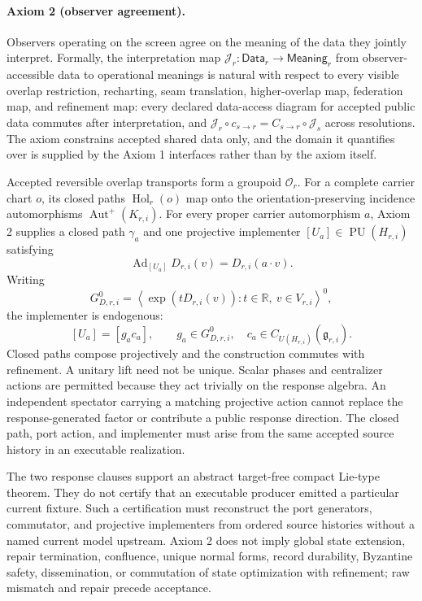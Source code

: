 \paragraph{Axiom 2 (observer agreement).}
Observers operating on the screen agree on the meaning of the data they
jointly interpret. Formally, the interpretation map
\(\mathcal J_r:\mathsf{Data}_r\to\mathsf{Meaning}_r\) from
observer-accessible data to operational meanings is natural with respect to
every visible overlap restriction, recharting, seam translation,
higher-overlap map, federation map, and refinement map: every declared
data-access diagram for accepted public data commutes after interpretation,
and \(\mathcal J_r\circ c_{s\to r}=C_{s\to r}\circ\mathcal J_s\) across
resolutions. The axiom constrains accepted shared data only, and the domain
it quantifies over is supplied by the Axiom 1 interfaces rather than by the
axiom itself.

Accepted reversible overlap transports form a groupoid \(\mathcal O_r\).
For a complete carrier chart \(o\), its closed paths
\(\operatorname{Hol}_r(o)\) map onto the orientation-preserving incidence
automorphisms \(\operatorname{Aut}^{+}(K_{r,i})\). For every proper carrier
automorphism \(a\), Axiom 2 supplies a closed path \(\gamma_a\) and one
projective implementer
\([U_a]\in\operatorname{PU}(H_{r,i})\) satisfying
\[
\operatorname{Ad}_{[U_a]}D_{r,i}(v)=D_{r,i}(a\cdot v).
\]
Writing
\[
G_{D,r,i}^{0}
=
\left\langle
\exp(tD_{r,i}(v)):t\in\mathbb R,\ v\in V_{r,i}
\right\rangle^{0},
\]
the implementer is endogenous:
\[
[U_a]=[g_a c_a],
\qquad
g_a\in G_{D,r,i}^{0},
\quad
c_a\in C_{U(H_{r,i})}(\mathfrak g_{r,i}).
\]
Closed paths compose projectively and the construction commutes with
refinement. A unitary lift need not be unique. Scalar phases and centralizer
actions are permitted because they act trivially on the response algebra.
An independent spectator carrying a matching projective action cannot
replace the response-generated factor or contribute a public response
direction. The closed path, port action, and implementer must arise from the
same accepted source history in an executable realization.

The two response clauses support an abstract target-free compact Lie-type
theorem. They do not certify that an executable producer emitted a particular
current fixture. Such a certification must reconstruct the port generators,
commutator, and projective implementers from ordered source histories without
a named current model upstream. Axiom 2 does not imply global state
extension, repair termination, confluence, unique normal forms, record
durability, Byzantine safety, dissemination, or commutation of state
optimization with refinement; raw mismatch and repair precede acceptance.

